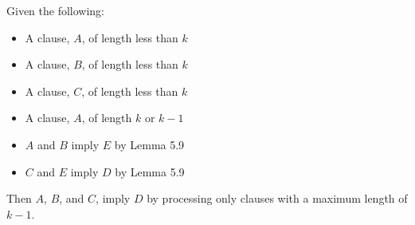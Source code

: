 \documentclass[manuscript]{acmart}
\begin{document}
    \begin{lemma}
        Given the following:
        \begin{itemize}
            \item A clause, $A$, of length less than $k$
            \item A clause, $B$, of length less than $k$
            \item A clause, $C$, of length less than $k$
            \item A clause, $A$, of length $k$ or $k - 1$
            \item $A$ and $B$ imply $E$ by Lemma 5.9
            \item $C$ and $E$ imply $D$ by Lemma 5.9
        \end{itemize}
        Then $A$, $B$, and $C$, imply $D$ by processing only clauses with a maximum length of $k - 1$.
    \end{lemma}
\end{document}
